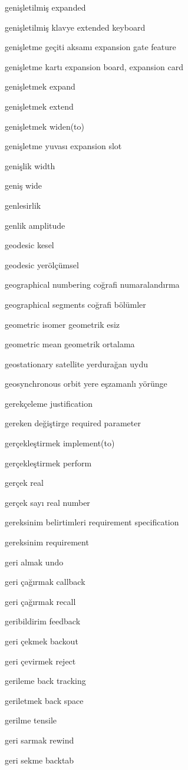 \documentclass[12pt,fleqn]{article}\usepackage{../../common}
\begin{document}
genişletilmiş expanded

genişletilmiş klavye extended keyboard

genişletme geçiti aksamı expansion gate feature

genişletme kartı expansion board, expansion card

genişletmek expand

genişletmek extend

genişletmek widen(to)

genişletme yuvası expansion slot

genişlik width

geniş wide

genlesirlik

genlik amplitude

geodesic kesel

geodesic yerölçümsel

geographical numbering coğrafi numaralandırma

geographical segments coğrafi bölümler

geometric isomer geometrik esiz

geometric mean geometrik ortalama

geostationary satellite yerdurağan uydu

geosynchronous orbit yere eşzamanlı yörünge

gerekçeleme justification

gereken değiştirge required parameter

gerçekleştirmek implement(to)

gerçekleştirmek perform

gerçek real

gerçek sayı real number

gereksinim belirtimleri requirement specification

gereksinim requirement

geri almak undo

geri çağırmak callback

geri çağırmak recall

geribildirim feedback

geri çekmek backout

geri çevirmek reject

gerileme back tracking

geriletmek back space

gerilme tensile

geri sarmak rewind

geri sekme backtab
\end{document}
